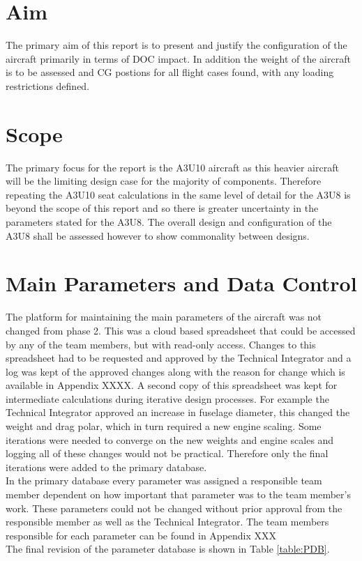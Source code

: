 \documentclass[11pt]{article}
\begin{document}
\section{Aim}
The primary aim of this report is to present and justify the configuration of the aircraft primarily in terms of DOC impact. In addition the weight of the aircraft is to be assessed and CG postions for all flight cases found, with any loading restrictions defined.

\section{Scope}

The primary focus for the report is the A3U10 aircraft as this heavier aircraft will be the limiting design case for the majority of components. Therefore repeating the A3U10 seat calculations in the same level of detail for the A3U8 is beyond the scope of this report and so there is greater uncertainty in the parameters stated for the A3U8. The overall design and configuration of the A3U8 shall be assessed however to show commonality between designs.

\section{Main Parameters and Data Control}

The platform for maintaining the main parameters of the aircraft was not changed from phase 2. This was a cloud based spreadsheet that could be accessed by any of the team members, but with read-only access. Changes to this spreadsheet had to be requested and approved by the Technical Integrator and a log was kept of the approved changes along with the reason for change which is available in Appendix XXXX. A second copy of this spreadsheet was kept for intermediate calculations during iterative design processes. For example the Technical Integrator approved an increase in fuselage diameter, this changed the weight and drag polar, which in turn required a new engine scaling. Some iterations were needed to converge on the new weights and engine scales and logging all of these changes would not be practical. Therefore only the final iterations were added to the primary database. \\
In the primary database every parameter was assigned a responsible team member dependent on how important that parameter was to the team member's work. These parameters could not be changed without prior approval from the responsible member as well as the Technical Integrator. The team members responsible for each parameter can be found in Appendix XXX\\
The final revision of the parameter database is shown in Table \ref{table:PDB}.
\end{document}
